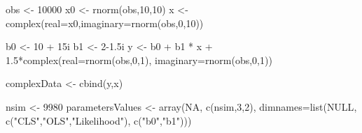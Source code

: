 \documentclass[
]{book}
\newenvironment{Shaded}{\begin{snugshade}}{\end{snugshade}}
\newcommand{\AttributeTok}[1]{\textcolor[rgb]{0.77,0.63,0.00}{#1}}
\newcommand{\ConstantTok}[1]{\textcolor[rgb]{0.00,0.00,0.00}{#1}}
\newcommand{\DecValTok}[1]{\textcolor[rgb]{0.00,0.00,0.81}{#1}}
\newcommand{\FloatTok}[1]{\textcolor[rgb]{0.00,0.00,0.81}{#1}}
\newcommand{\FunctionTok}[1]{\textcolor[rgb]{0.00,0.00,0.00}{#1}}
\newcommand{\NormalTok}[1]{#1}
\newcommand{\OtherTok}[1]{\textcolor[rgb]{0.56,0.35,0.01}{#1}}
\newcommand{\SpecialCharTok}[1]{\textcolor[rgb]{0.00,0.00,0.00}{#1}}
\newcommand{\StringTok}[1]{\textcolor[rgb]{0.31,0.60,0.02}{#1}}
\begin{document}
\begin{Shaded}
\begin{Highlighting}[]
\NormalTok{obs }\OtherTok{\textless{}{-}} \DecValTok{10000}
\NormalTok{x0 }\OtherTok{\textless{}{-}} \FunctionTok{rnorm}\NormalTok{(obs,}\DecValTok{10}\NormalTok{,}\DecValTok{10}\NormalTok{)}
\NormalTok{x }\OtherTok{\textless{}{-}} \FunctionTok{complex}\NormalTok{(}\AttributeTok{real=}\NormalTok{x0,}\AttributeTok{imaginary=}\FunctionTok{rnorm}\NormalTok{(obs,}\DecValTok{0}\NormalTok{,}\DecValTok{10}\NormalTok{))}

\NormalTok{b0 }\OtherTok{\textless{}{-}} \DecValTok{10} \SpecialCharTok{+}\NormalTok{ 15i}
\NormalTok{b1 }\OtherTok{\textless{}{-}} \DecValTok{2}\FloatTok{{-}1.5}\NormalTok{i}
\NormalTok{y }\OtherTok{\textless{}{-}}\NormalTok{ b0 }\SpecialCharTok{+}\NormalTok{ b1 }\SpecialCharTok{*}\NormalTok{ x }\SpecialCharTok{+} \FloatTok{1.5}\SpecialCharTok{*}\FunctionTok{complex}\NormalTok{(}\AttributeTok{real=}\FunctionTok{rnorm}\NormalTok{(obs,}\DecValTok{0}\NormalTok{,}\DecValTok{1}\NormalTok{),}
                               \AttributeTok{imaginary=}\FunctionTok{rnorm}\NormalTok{(obs,}\DecValTok{0}\NormalTok{,}\DecValTok{1}\NormalTok{))}

\NormalTok{complexData }\OtherTok{\textless{}{-}} \FunctionTok{cbind}\NormalTok{(y,x)}

\NormalTok{nsim }\OtherTok{\textless{}{-}} \DecValTok{9980}
\NormalTok{parametersValues }\OtherTok{\textless{}{-}}
    \FunctionTok{array}\NormalTok{(}\ConstantTok{NA}\NormalTok{, }\FunctionTok{c}\NormalTok{(nsim,}\DecValTok{3}\NormalTok{,}\DecValTok{2}\NormalTok{),}
          \AttributeTok{dimnames=}\FunctionTok{list}\NormalTok{(}\ConstantTok{NULL}\NormalTok{,}
                        \FunctionTok{c}\NormalTok{(}\StringTok{"CLS"}\NormalTok{,}\StringTok{"OLS"}\NormalTok{,}\StringTok{"Likelihood"}\NormalTok{),}
                        \FunctionTok{c}\NormalTok{(}\StringTok{"b0"}\NormalTok{,}\StringTok{"b1"}\NormalTok{)))}


\end{Highlighting}
\end{Shaded}
\end{document}
